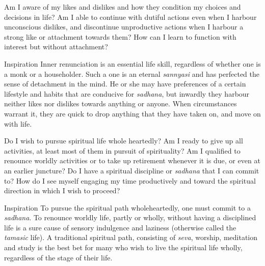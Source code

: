 \newpage
\begin{mananam}{} 
\mananamtext Am I aware of my likes and dislikes and how they condition my choices and decisions in life? Am I able to continue with dutiful actions even when I harbour unconscious dislikes, and discontinue unproductive actions when I harbour a strong like or attachment towards them? How can I learn to function with interest but without attachment?
\end{mananam}
\WritingHand{}
\begin{inspiration}{\mananamfont Inspiration}
\mananamtext Inner renunciation is an essential life skill, regardless of whether one is a monk or a householder. Such a one is an eternal \emph{sannyasi} and has perfected the sense of detachment in the mind. He or she may have preferences of a certain lifestyle and habits that are conducive for \emph{sadhana}, but inwardly they harbour neither likes nor dislikes towards anything or anyone. When circumstances warrant it, they are quick to drop anything that they have taken on, and move on with life.
\end{inspiration}
\newpage

\newpage
\begin{mananam}{} 
\mananamtext Do I wish to pursue spiritual life whole heartedly? Am I ready to give up all activities, at least most of them in pursuit of spirituality? Am I qualified to renounce worldly activities or to take up retirement whenever it is due, or even at an earlier juncture? Do I have a spiritual discipline or \emph{sadhana} that I can commit to? How do I see myself engaging my time productively and toward the spiritual direction in which I wish to proceed?
\end{mananam}
\WritingHand{}
\begin{inspiration}{\mananamfont Inspiration}
\mananamtext To pursue the spiritual path wholeheartedly, one must commit to a \emph{sadhana}. To renounce worldly life, partly or wholly, without having a disciplined life is a sure cause of sensory indulgence and laziness (otherwise called the \emph{tamasic} life). A traditional spiritual path, consisting of \emph{seva}, worship, meditation and study is the best bet for many who wish to live the spiritual life wholly, regardless of the stage of their life.
\end{inspiration}
\newpage


